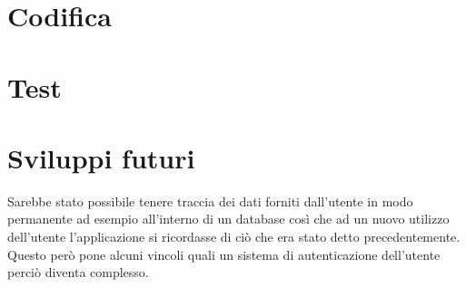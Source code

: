 \section{Codifica}

\section{Test}

\section{Sviluppi futuri}
Sarebbe stato possibile tenere traccia dei dati forniti dall'utente in modo permanente ad esempio all'interno di un database così che ad un nuovo utilizzo dell'utente l'applicazione si ricordasse di ciò che era stato detto precedentemente. Questo però pone alcuni vincoli quali un sistema di autenticazione dell'utente perciò diventa complesso.